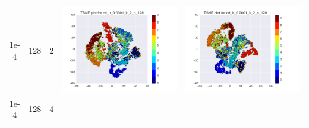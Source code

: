 \documentclass[12pt]{report}
\begin{document}
\begin{table}[H]
\begin{tabular}{ | c | c | c | c || c |}
\begin{minipage}{.3\textwidth}
    \end{minipage}
    \\ \hline
    1e-4 & 128 & 2 &
    \begin{minipage}{.3\textwidth}
      \includegraphics[scale=0.25]{cd_lr_0_0001_k_2_n_128.png}
    \end{minipage} &
    \begin{minipage}{.3\textwidth}
      \includegraphics[scale=0.25]{test_cd_lr_0_0001_k_2_n_128.png}
    \end{minipage}
    \\ \hline
    1e-4 & 128 & 4 &
    \begin{minipage}{.3\textwidth}

\end{minipage}
\end{tabular}
\end{table}
\end{document}
